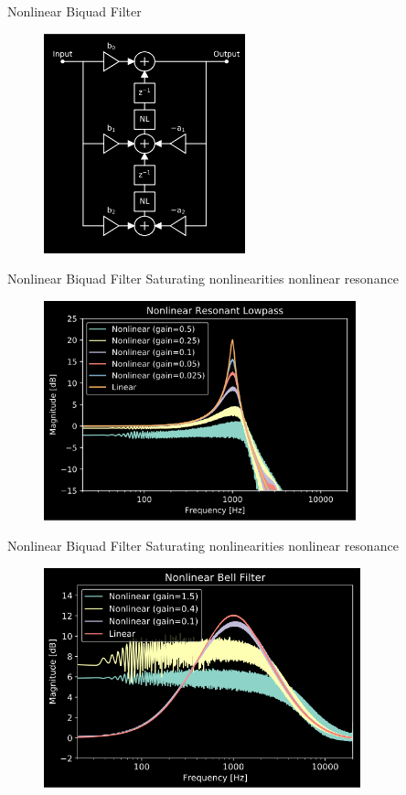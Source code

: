 \begin{frame}{Nonlinear Biquad Filter}
    \begin{figure}
        \includegraphics[height=2.5in]{../NonlinearBiquad/Pics/NL-TDF-II.png}
    \end{figure}
\end{frame}

\begin{frame}{Nonlinear Biquad Filter}
    Saturating nonlinearities \rightarrow nonlinear resonance
    \begin{figure}
        \includegraphics[height=2.5in]{../NonlinearBiquad/Pics/NL-LPF.png}
    \end{figure}
\end{frame}

\begin{frame}{Nonlinear Biquad Filter}
    Saturating nonlinearities \rightarrow nonlinear resonance
    \begin{figure}
        \includegraphics[height=2.5in]{../NonlinearBiquad/Pics/NL-Bell.png}
    \end{figure}
\end{frame}

